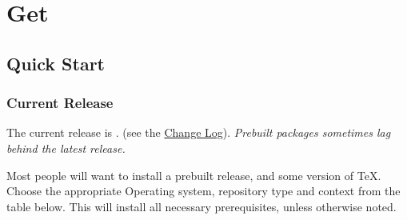 \documentclass{article}
\begin{document}


\section{Get \LaTeXML}\label{get}
\def\GitHub{\href{https://github.com/}{GitHub}}
\def\MacPorts{\href{https://www.macports.org}{MacPorts}}
\def\MacTeX{\href{https://tug.org/mactex/}{MacTeX}}
\def\Chocolatey{\href{https://chocolatey.org}{Chocolatey}}
\def\MikTeX{\href{https://MiKTeX.org}{MikTeX}}


\subsection{Quick Start}\label{get.quick}
\subsubsection{Current Release}\label{get.current}
The current release is \textbf{\CurrentVersion}. (see the \href{Changes}{Change Log}).
\emph{Prebuilt packages sometimes lag behind the latest release.}

Most people will want to install a prebuilt release,
and some version of \TeX. Choose the appropriate
Operating system, repository type and context from the table below.
This will install all necessary prerequisites, unless otherwise noted.
\end{document}
